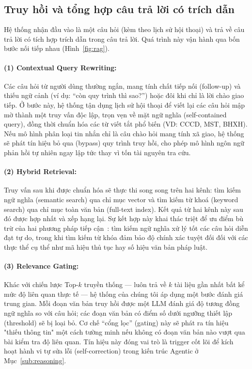 \documentclass[11pt]{article}
\begin{document}
%                          
\subsection{Truy hồi và tổng hợp câu trả lời có trích dẫn}
\label{sub:rag}

Hệ thống nhận đầu vào là một câu hỏi (kèm theo lịch sử hội thoại) và trả về câu trả lời có tích hợp trích dẫn trong câu trả lời. Quá trình này vận hành qua bốn bước nối tiếp nhau (Hình~\ref{fig:rag}).

\paragraph{(1) Contextual Query Rewriting: }
Các câu hỏi từ người dùng thường ngắn, mang tính chất tiếp nối (follow-up) và thiếu ngữ cảnh (ví dụ: ``còn quy trình thì sao?'') hoặc đôi khi chỉ là lời chào giao tiếp. Ở bước này, hệ thống tận dụng lịch sử hội thoại để viết lại các câu hỏi mập mờ thành một truy vấn độc lập, trọn vẹn về mặt ngữ nghĩa (self-contained query), đồng thời chuẩn hóa các từ viết tắt phổ biến (VD: CCCD, MST, BHXH). Nếu mô hình phân loại tin nhắn chỉ là câu chào hỏi mang tính xã giao, hệ thống sẽ phát tín hiệu bỏ qua (bypass) quy trình truy hồi, cho phép mô hình ngôn ngữ phản hồi tự nhiên ngay lập tức thay vì tốn tài nguyên tra cứu.

\paragraph{(2) Hybrid Retrieval: }
Truy vấn sau khi được chuẩn hóa sẽ thực thi song song trên hai kênh: tìm kiếm ngữ nghĩa (semantic search) qua chỉ mục vector và tìm kiếm từ khoá (keyword search) qua chỉ mục toàn văn bản (full-text index). Kết quả từ hai kênh này sau đó được hợp nhất và xếp hạng lại. Sự kết hợp này khai thác triệt để ưu điểm bù trừ của hai phương pháp tiếp cận~\citep{karpukhin2020dpr,robertson2009bm25}: tìm kiếm ngữ nghĩa xử lý tốt các câu hỏi diễn đạt tự do, trong khi tìm kiếm từ khóa đảm bảo độ chính xác tuyệt đối đối với các thực thể cụ thể như mã hiệu thủ tục hay số hiệu văn bản pháp luật.

\paragraph{(3) Relevance Gating: }
Khác với chiến lược Top-$k$ truyền thống — luôn trả về $k$ tài liệu gần nhất bất kể mức độ liên quan thực tế — hệ thống của chúng tôi áp dụng một bước đánh giá trung gian. Mỗi đoạn văn bản truy hồi được một LLM đánh giá độ tương đồng ngữ nghĩa so với câu hỏi; các đoạn văn bản có điểm số dưới ngưỡng thiết lập (threshold) sẽ bị loại bỏ. Cơ chế ``cổng lọc'' (gating) này sẽ phát ra tín hiệu "thiếu thông tin" một cách tường minh nếu không có đoạn văn bản nào vượt qua bài kiểm tra độ liên quan. Tín hiệu này đóng vai trò là trigger cốt lõi để kích hoạt hành vi tự sửa lỗi (self-correction) trong kiến trúc Agentic ở Mục~\ref{sub:reasoning}.
\end{document}
